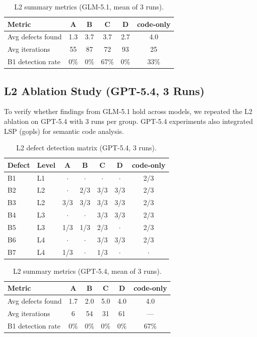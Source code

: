 \documentclass[sigconf,nonacm]{acmart}
\begin{document}
\begin{table}[t]
\caption{L2 summary metrics (GLM-5.1, mean of 3 runs).}
\label{tab:glm-summary}
\small
\begin{tabular}{lccccc}
\toprule
Metric & A & B & C & D & code-only \\
\midrule
Avg defects found & 1.3 & 3.7 & 3.7 & 2.7 & 4.0 \\
Avg iterations & 55 & 87 & 72 & 93 & 25 \\
B1 detection rate & 0\% & 0\% & 67\% & 0\% & 33\% \\
\bottomrule
\end{tabular}
\end{table}


\subsection{L2 Ablation Study (GPT-5.4, 3 Runs)}

To verify whether findings from GLM-5.1 hold across models, we repeated the L2 ablation on GPT-5.4 with 3 runs per group. GPT-5.4 experiments also integrated LSP (gopls) for semantic code analysis.

\begin{table}[htbp]
\caption{L2 defect detection matrix (GPT-5.4, 3 runs).}
\label{tab:gpt-matrix}
\small
\begin{tabular}{llccccc}
\toprule
Defect & Level & A & B & C & D & code-only \\
\midrule
B1 & L1 & $\cdot$ & $\cdot$ & $\cdot$ & $\cdot$ & 2/3 \\
B2 & L2 & $\cdot$ & 2/3 & 3/3 & 3/3 & 2/3 \\
B3 & L2 & 3/3 & 3/3 & 3/3 & 3/3 & 2/3 \\
B4 & L3 & $\cdot$ & $\cdot$ & 3/3 & 3/3 & 2/3 \\
B5 & L3 & 1/3 & 1/3 & 2/3 & $\cdot$ & 2/3 \\
B6 & L4 & $\cdot$ & $\cdot$ & 3/3 & 3/3 & 2/3 \\
B7 & L4 & 1/3 & $\cdot$ & 1/3 & $\cdot$ & $\cdot$ \\
\bottomrule
\end{tabular}
\end{table}

\begin{table}[htbp]
\caption{L2 summary metrics (GPT-5.4, mean of 3 runs).}
\label{tab:gpt-summary}
\small
\begin{tabular}{lccccc}
\toprule
Metric & A & B & C & D & code-only \\
\midrule
Avg defects found & 1.7 & 2.0 & 5.0 & 4.0 & 4.0 \\
Avg iterations & 6 & 54 & 31 & 61 & --- \\
B1 detection rate & 0\% & 0\% & 0\% & 0\% & 67\% \\
\bottomrule
\end{tabular}
\end{table}
\end{document}
